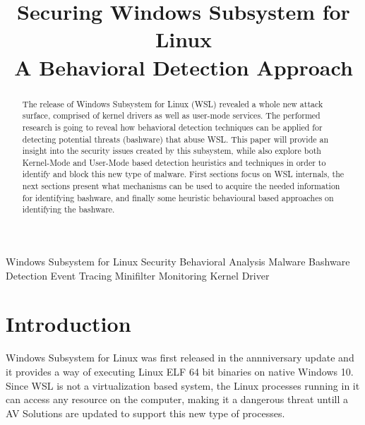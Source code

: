 \documentclass[conference]{IEEEtran}
\begin{document}
\title{
    Securing Windows Subsystem for Linux \\
    A Behavioral Detection Approach
}
% 

\author{
\and
{}
}

\maketitle

\begin{abstract}
The release of Windows Subsystem for Linux (WSL) revealed a whole new attack surface, comprised of kernel drivers as well as user-mode services.
The performed research is going to reveal how behavioral detection techniques can be applied for detecting potential threats (bashware) that abuse WSL.
This paper will provide an insight into the security issues created by this subsystem, while also explore both Kernel-Mode and User-Mode based
detection heuristics and techniques in order to identify and block this new type of malware. First sections focus on WSL internals, the next
sections present what mechanisms can be used to acquire the needed information for identifying bashware, and finally some heuristic
behavioural based approaches on identifying the bashware.
\end{abstract}

\begin{IEEEkeywords}
Windows Subsystem for Linux Security Behavioral Analysis Malware Bashware Detection Event Tracing Minifilter Monitoring Kernel Driver
\end{IEEEkeywords}

\section{Introduction}
Windows Subsystem for Linux was first released in the annniversary update and it provides a way of executing Linux ELF 64 bit binaries on
native Windows 10. Since WSL is not a virtualization based system, the Linux processes running in it can access any resource on the computer,
making it a dangerous threat untill a AV Solutions are updated to support this new type of processes.
\end{document}
